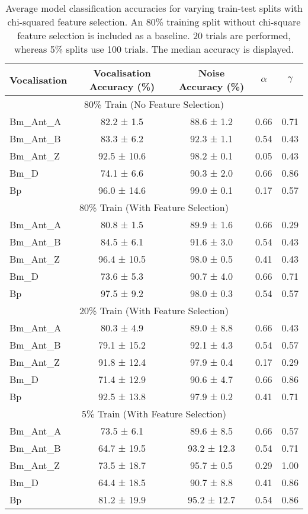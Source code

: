 {\begin{table}[]
\caption{Average model classification accuracies for varying train-test splits with chi-squared feature selection. An 80\% training split without chi-square feature selection is included as a baseline. 20 trials are performed, whereas 5\% splits use 100 trials. The median accuracy is displayed.}
\label{tab:clsres}
\renewcommand{\arraystretch}{0.8}
\begin{tabular}{lcccc}
\textbf{Vocalisation} & \textbf{Vocalisation Accuracy (\%)} & \textbf{Noise Accuracy (\%)} & $\alpha$ & $\gamma$  \\ \hline  
\multicolumn{5}{c}{80\% Train (No Feature Selection)} \\ \hline 
Bm\_Ant\_A & 82.2 ± 1.5  & 88.6 ± 1.2 & 0.66 & 0.71 \\
Bm\_Ant\_B & 83.3 ± 6.2  & 92.3 ± 1.1 & 0.54 & 0.43 \\
Bm\_Ant\_Z & 92.5 ± 10.6 & 98.2 ± 0.1 & 0.05 & 0.43 \\
Bm\_D      & 74.1 ± 6.6  & 90.3 ± 2.0 & 0.66 & 0.86 \\
Bp         & 96.0 ± 14.6 & 99.0 ± 0.1 & 0.17 & 0.57\\  \hline 

\multicolumn{5}{c}{80\% Train (With Feature Selection)} \\ \hline 
Bm\_Ant\_A & 80.8 ± 1.5  & 89.9 ± 1.6 & 0.66 & 0.29 \\
Bm\_Ant\_B & 84.5 ± 6.1  & 91.6 ± 3.0 & 0.54 & 0.43 \\
Bm\_Ant\_Z & 96.4 ± 10.5 & 98.0 ± 0.5 & 0.41 & 0.43 \\
Bm\_D      & 73.6 ± 5.3  & 90.7 ± 4.0 & 0.66 & 0.71 \\
Bp         & 97.5 ± 9.2  & 98.0 ± 0.3 & 0.54 & 0.57 \\ \hline     
\multicolumn{5}{c}{20\% Train (With Feature Selection)} \\ \hline 
Bm\_Ant\_A & 80.3 ± 4.9  & 89.0 ± 8.8 & 0.66 & 0.43 \\
Bm\_Ant\_B & 79.1 ± 15.2 & 92.1 ± 4.3 & 0.54 & 0.57 \\
Bm\_Ant\_Z & 91.8 ± 12.4 & 97.9 ± 0.4 & 0.17 & 0.29 \\
Bm\_D      & 71.4 ± 12.9 & 90.6 ± 4.7 & 0.66 & 0.86 \\
Bp         & 92.5 ± 13.8 & 97.9 ± 0.2 & 0.41 & 0.71\\ \hline  
\multicolumn{5}{c}{5\% Train (With Feature Selection)} \\ \hline 
Bm\_Ant\_A & 73.5 ± 6.1  & 89.6 ± 8.5  & 0.66 & 0.57 \\
Bm\_Ant\_B & 64.7 ± 19.5 & 93.2 ± 12.3 & 0.54 & 0.71 \\
Bm\_Ant\_Z & 73.5 ± 18.7 & 95.7 ± 0.5  & 0.29 & 1.00 \\
Bm\_D      & 64.4 ± 18.5 & 90.7 ± 8.8  & 0.41 & 0.86 \\
Bp         & 81.2 ± 19.9 & 95.2 ± 12.7 & 0.54 & 0.86 \\  \hline 


\end{tabular}
\end{table}}
